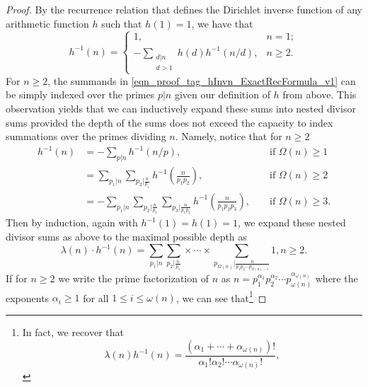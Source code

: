 \documentclass[11pt,reqno,a4letter]{article}
\numberwithin{figure}{section}
\numberwithin{table}{section}
\theoremstyle{plain}
\numberwithin{theorem}{section}
\theoremstyle{definition}
\begin{document}
\begin{proof}
By the recurrence relation that defines the Dirichlet inverse function of any 
arithmetic function $h$ such that $h(1) = 1$, we have that \cite[\S 2.7]{APOSTOLANUMT} 
\begin{equation} 
\label{eqn_proof_tag_hInvn_ExactRecFormula_v1}
h^{-1}(n) = \begin{cases} 
            1, & n = 1; \\ 
            -\sum\limits_{\substack{d|n \\ d>1}} h(d) h^{-1}(n/d), & n \geq 2. 
            \end{cases} 
\end{equation} 
For $n \geq 2$, the summands in \eqref{eqn_proof_tag_hInvn_ExactRecFormula_v1} 
can be simply indexed over the primes $p|n$ given our definition of $h$ from above. 
This observation yields that we can inductively 
expand these sums into nested divisor sums provided the depth of the sums does not exceed the 
capacity to index summations over the primes dividing $n$. Namely, notice that for $n \geq 2$ 
\begin{align*} 
h^{-1}(n) & = -\sum_{p|n} h^{-1}(n/p), && \text{\ if\ } \Omega(n) \geq 1 \\ 
     & = \sum_{p_1|n} \sum_{p_2|\frac{n}{p_1}} h^{-1}\left(\frac{n}{p_1p_2}\right), && \text{\ if\ } \Omega(n) \geq 2 \\ 
     & = -\sum_{p_1|n} \sum_{p_2|\frac{n}{p_1}} \sum_{p_3|\frac{n}{p_1p_2}} h^{-1}\left(\frac{n}{p_1p_2p_3}\right), 
     && \text{\ if\ } \Omega(n) \geq 3. 
\end{align*} 
Then by induction, again with $h^{-1}(1) = h(1) = 1$, we expand these 
nested divisor sums as above to the maximal possible depth as 
\begin{equation} 
\label{eqn_proof_tag_hInvn_ExactNestedSumFormula_v2} 
\lambda(n) \cdot h^{-1}(n) = \sum_{p_1|n} \sum_{p_2|\frac{n}{p_1}} \times \cdots \times 
     \sum_{p_{\Omega(n)}|\frac{n}{p_1p_2 \cdots p_{\Omega(n)-1}}} 1, n \geq 2. 
\end{equation} 
If for $n \geq 2$ we write the prime factorization of $n$ as 
$n = p_1^{\alpha_1} p_2^{\alpha_2} \cdots p_{\omega(n)}^{\alpha_{\omega(n)}}$ where the exponents $\alpha_i \geq 1$ 
for all $1 \leq i \leq \omega(n)$, we can see that\footnote{
     In fact, we recover that 
     \[
     \lambda(n) h^{-1}(n) = \frac{(\alpha_1+\cdots+\alpha_{\omega(n)})!}{ 
          \alpha_1! \alpha_2! \cdots \alpha_{\omega(n)}!}, 
     \]
}
\end{proof}
\end{document}
